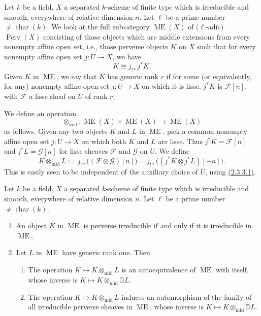 Let \(k\) be a field, \(X\) a separated \(k\)-scheme of finite type which is
irreducible and smooth, everywhere of relative dimension \(n\). Let \(\ell\)
be a prime number \(\ne\operatorname{char}(k)\). We look at the full
subcategory \(\operatorname{ME}(X)\) of \((\ell\)-adic) \(\operatorname{Perv}(X)\)
consisting of those objects which are middle extensions from every nonempty
affine open set, i.e., those perverse objects \(K\) on \(X\) such that for
every nonempty affine open set \(j:U\to X\), we have
\[
  K\cong j_{!*}j^*K.
\]
Given \(K\) in \(\operatorname{ME}\), we say that \(K\) has generic rank
\(r\) if for some (or equivalently, for any) nonempty affine open set
\(j:U\to X\) on which it is lisse, \(j^*K\) is \(\mathcal{F}[n]\), with
\(\mathcal{F}\) a lisse sheaf on \(U\) of rank \(r\).

We define an operation
\[
  \otimes_{\mathrm{mid}}:\operatorname{ME}(X)\times\operatorname{ME}(X)
  \longrightarrow \operatorname{ME}(X)
\]
as follows. Given any two objects \(K\) and \(L\) in \(\operatorname{ME}\), pick
a common nonempty affine open set \(j:U\to X\) on which both \(K\) and \(L\)
are lisse. Thus \(j^*K=\mathcal{F}[n]\) and \(j^*L=\mathcal{G}[n]\) for lisse
sheaves \(\mathcal{F}\) and \(\mathcal{G}\) on \(U\). We define
\[
  K\otimes_{\mathrm{mid}}L
  :=
  j_{!*}\bigl((\mathcal{F}\otimes\mathcal{G})[n]\bigr)
  =
  j_{!*}\bigl((j^*K\otimes j^*L)[-n]\bigr).
\]
This is easily seen to be independent of the auxiliary choice of \(U\), using
\hyperref[par:2.3.3.1]{(2.3.3.1)}.

Let \(k\) be a field, \(X\) a separated \(k\)-scheme of finite type which is
irreducible and smooth, everywhere of relative dimension \(n\). Let \(\ell\)
be a prime number \(\ne\operatorname{char}(k)\).
\begin{enumerate}[label=(\arabic*)]
\item An object \(K\) in \(\operatorname{ME}\) is perverse irreducible if and
only if it is irreducible in \(\operatorname{ME}\).
\item Let \(L\) in \(\operatorname{ME}\) have generic rank one. Then
\begin{enumerate}[label=(2\alph*)]
\item The operation \(K\mapsto K\otimes_{\mathrm{mid}}L\) is an
autoequivalence of \(\operatorname{ME}\) with
itself, whose inverse is \(K\mapsto K\otimes_{\mathrm{mid}}\mathbb{D}L\).
\item The operation \(K\mapsto K\otimes_{\mathrm{mid}}L\) induces an
automorphism of the family of all irreducible perverse sheaves in
\(\operatorname{ME}\), whose inverse is
\(K\mapsto K\otimes_{\mathrm{mid}}\mathbb{D}L\).
\end{enumerate}
\end{enumerate}

